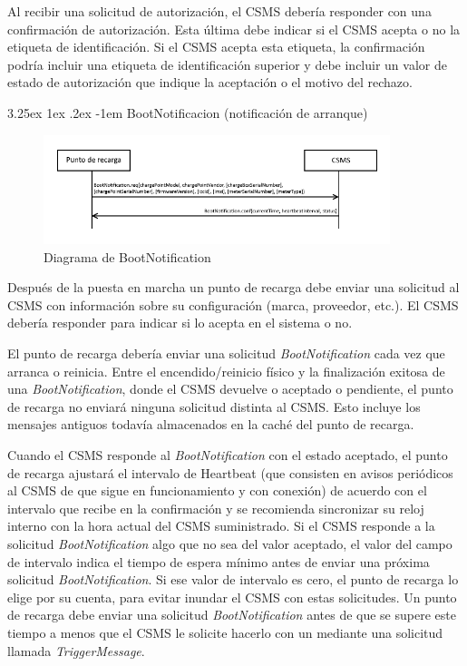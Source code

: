 \documentclass[12pt,a4paper,onecolumn,oneside]{report}
\makeatletter
\renewcommand\paragraph{\@startsection{paragraph}{5}{\z@}%
  {3.25ex \@plus1ex \@minus.2ex}%
  {-1em}%
  {\normalfont\normalsize\bfseries}}
\makeatother
\begin{document}
Al recibir una solicitud de autorización, el CSMS debería responder con una confirmación de autorización. Esta última debe indicar si el CSMS acepta o no la etiqueta de identificación. Si el CSMS acepta esta etiqueta, la confirmación podría incluir una etiqueta de identificación superior y debe incluir un valor de estado de autorización que indique la aceptación o el motivo del rechazo.


\paragraph{BootNotificacion (notificación de arranque)}
\label{BootNotificacion (notificación de arranque)}


\begin{figure}[H] 
\centering
  \includegraphics[width=0.9\textwidth]{figuras/diagramabootnotification.png}
  \caption[Diagrama de \textit{BootNotification}]{Diagrama de BootNotification\\
  }
  \label{fig:diagramabootnotification}
\end{figure}


Después de la puesta en marcha un punto de recarga debe enviar una solicitud al CSMS con información sobre su configuración (marca, proveedor, etc.). El CSMS debería responder para indicar si lo acepta en el sistema o no.

El punto de recarga debería enviar una solicitud \textit{BootNotification} cada vez que arranca o reinicia. Entre el encendido/reinicio físico y la finalización exitosa de una \textit{BootNotification}, donde el CSMS devuelve o aceptado o pendiente, el punto de recarga no enviará ninguna solicitud distinta al CSMS. Esto incluye los mensajes antiguos todavía almacenados en la caché del punto de recarga.

Cuando el CSMS responde al \textit{BootNotification} con el estado aceptado, el punto de recarga ajustará el intervalo de Heartbeat (que consisten en avisos periódicos al CSMS de que sigue en funcionamiento y con conexión) de acuerdo con el intervalo que recibe en la confirmación y se recomienda sincronizar su reloj interno con la hora actual del CSMS suministrado. Si el CSMS responde a la solicitud \textit{BootNotification} algo que no sea del valor aceptado, el valor del campo de intervalo indica el tiempo de espera mínimo antes de enviar una próxima solicitud \textit{BootNotification}. Si ese valor de intervalo es cero, el punto de recarga lo elige por su cuenta, para evitar inundar el CSMS con estas solicitudes. Un punto de recarga debe enviar una solicitud \textit{BootNotification} antes de que se supere este tiempo a menos que el CSMS le solicite hacerlo con un mediante una solicitud llamada \textit{TriggerMessage}.
\end{document}
